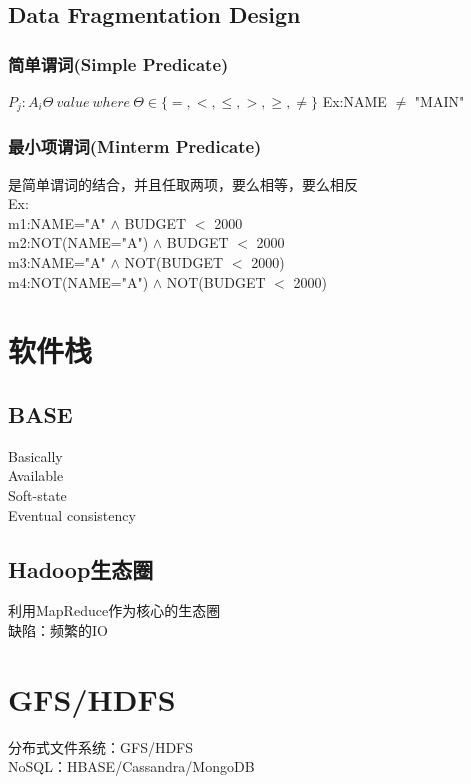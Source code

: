 \documentclass{article}
\begin{document}
\begin{CJK}{UTF8}{gbsn}
	\subsection*{Data Fragmentation Design}
	\subsubsection*{简单谓词(Simple Predicate)}
	$P_j:A_i\Theta\ value\ where\ \Theta\in\lbrace=,<,\leq,>,\geq,\neq \rbrace$
	Ex:NAME $\neq$ "MAIN"\\
	\subsubsection*{最小项谓词(Minterm Predicate)}
	是简单谓词的结合，并且任取两项，要么相等，要么相反\\
	Ex:\\
	m1:NAME="A" $\land$ BUDGET $<$ 2000\\
	m2:NOT(NAME="A") $\land$ BUDGET $<$ 2000\\
	m3:NAME="A" $\land$ NOT(BUDGET $<$ 2000)\\
	m4:NOT(NAME="A") $\land$ NOT(BUDGET $<$ 2000)\\
	
	
	\section*{软件栈}
	
	
	\subsection*{BASE}
	Basically\\
	Available\\
	Soft-state\\
	Eventual consistency\\
	
	\subsection*{Hadoop生态圈}
	利用MapReduce作为核心的生态圈\\
	缺陷：频繁的IO\\
	
	
	\section*{GFS/HDFS}
	分布式文件系统：GFS/HDFS\\
	NoSQL：HBASE/Cassandra/MongoDB\\

\end{CJK}
\end{document}
